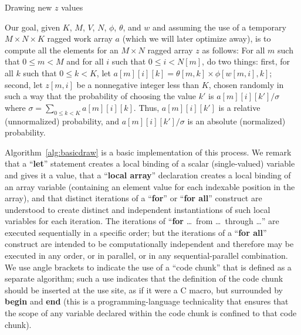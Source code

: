 \documentclass[10pt,nohyperref]{sigplanconf}
\newcommand*\Assign[2]{\State #1 $\gets$ #2}
\newcommand*\LocalArray[1]{\State {\bf local array} #1}
\newcommand*\Bind[2]{\State {\bf let} #1 $\gets$ #2}
\newcommand*\Remark[1]{\State \(\triangleright\) #1}
\newcommand*\Var[1]{{\mathit{#1}}}
\newcommand*\Output{\;\mathbf{output}\;}
\newcommand*\ProcTwoX[1]{\State\hbox{\hskip-\algorithmicindent\hskip\wd\proctwobox#1$\bigr)$}}
\newcommand*\UseCodeChunk[1]{\State $\langle${#1}$\rangle$}
\begin{document}
\begin{algorithm}[t]
\caption{Drawing new $z$ values}\label{alg:basicdraw}
\end{algorithm}


Our goal, given $K$, $M$, $V$, $N$, $\phi$, $\theta$, and $w$ and
assuming the use of a temporary $M \times N \times K$ ragged work array $a$ (which we will later optimize away), is to compute
all the elements for an $M \times N$ ragged array $z$ as follows:
For all $m$ such that $0 \leq m < M$ and for all $i$ such that $0 \leq i < N[m]$, do two things:
first, for all $k$ such that $0 \leq k < K$, let $a[m][i][k] = \theta[m, k] \times \phi[w[m, i], k]$;
second, let $z[m, i]$ be a nonnegative integer less than $K$, chosen randomly in such a way that the probability of choosing
the value $k'$ is $a[m][i][k']/\sigma$ where
$\sigma = \sum\limits_{0 \leq k < K} a[m][i][k]$.
Thus, $a[m][i][k']$ is a relative (unnormalized) probability, and $a[m][i][k']/\sigma$ is an absolute (normalized) probability.


Algorithm~\ref{alg:basicdraw} is a basic implementation of this process.
We remark that a ``{\bf let}'' statement creates a local binding of a scalar (single-valued) variable and gives it a value,
that a ``{\bf local array}'' declaration creates a local binding of an array variable
(containing an element value for each indexable position in the array), and that distinct iterations of a ``{\bf for}'' or ``{\bf for all}'' construct are understood to create
distinct and independent instantiations of such local variables for each iteration.  The iterations of ``{\bf for} \ldots\ from \ldots\ through \ldots''
are executed sequentially in a specific order; but the iterations of a ``{\bf for all}'' construct are intended to be computationally independent
and therefore may be executed in any order, or in parallel, or in any sequential-parallel combination.
We use angle brackets to indicate the use of a ``code chunk'' that is defined as a separate algorithm;
such a use indicates that the definition of the code chunk should be inserted at the use site, as if it were a C macro,
but surrounded by {\bf begin} and {\bf end} (this is a programming-language
technicality that ensures that the scope of any variable declared within the code chunk is confined to that code chunk).
\end{document}
